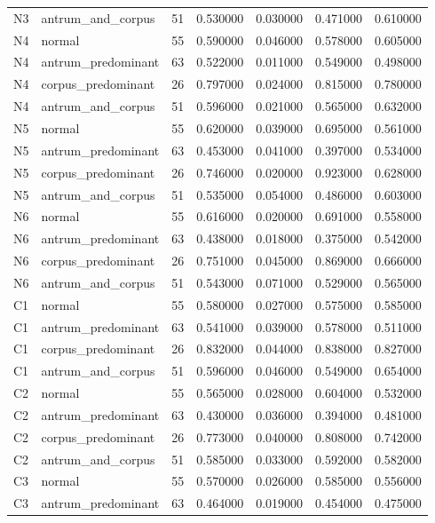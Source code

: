 \begin{table}
\begin{tabular}{llrrrrr}
N3 & antrum\_and\_corpus & 51 & 0.530000 & 0.030000 & 0.471000 & 0.610000 \\
N4 & normal & 55 & 0.590000 & 0.046000 & 0.578000 & 0.605000 \\
N4 & antrum\_predominant & 63 & 0.522000 & 0.011000 & 0.549000 & 0.498000 \\
N4 & corpus\_predominant & 26 & 0.797000 & 0.024000 & 0.815000 & 0.780000 \\
N4 & antrum\_and\_corpus & 51 & 0.596000 & 0.021000 & 0.565000 & 0.632000 \\
N5 & normal & 55 & 0.620000 & 0.039000 & 0.695000 & 0.561000 \\
N5 & antrum\_predominant & 63 & 0.453000 & 0.041000 & 0.397000 & 0.534000 \\
N5 & corpus\_predominant & 26 & 0.746000 & 0.020000 & 0.923000 & 0.628000 \\
N5 & antrum\_and\_corpus & 51 & 0.535000 & 0.054000 & 0.486000 & 0.603000 \\
N6 & normal & 55 & 0.616000 & 0.020000 & 0.691000 & 0.558000 \\
N6 & antrum\_predominant & 63 & 0.438000 & 0.018000 & 0.375000 & 0.542000 \\
N6 & corpus\_predominant & 26 & 0.751000 & 0.045000 & 0.869000 & 0.666000 \\
N6 & antrum\_and\_corpus & 51 & 0.543000 & 0.071000 & 0.529000 & 0.565000 \\
C1 & normal & 55 & 0.580000 & 0.027000 & 0.575000 & 0.585000 \\
C1 & antrum\_predominant & 63 & 0.541000 & 0.039000 & 0.578000 & 0.511000 \\
C1 & corpus\_predominant & 26 & 0.832000 & 0.044000 & 0.838000 & 0.827000 \\
C1 & antrum\_and\_corpus & 51 & 0.596000 & 0.046000 & 0.549000 & 0.654000 \\
C2 & normal & 55 & 0.565000 & 0.028000 & 0.604000 & 0.532000 \\
C2 & antrum\_predominant & 63 & 0.430000 & 0.036000 & 0.394000 & 0.481000 \\
C2 & corpus\_predominant & 26 & 0.773000 & 0.040000 & 0.808000 & 0.742000 \\
C2 & antrum\_and\_corpus & 51 & 0.585000 & 0.033000 & 0.592000 & 0.582000 \\
C3 & normal & 55 & 0.570000 & 0.026000 & 0.585000 & 0.556000 \\
C3 & antrum\_predominant & 63 & 0.464000 & 0.019000 & 0.454000 & 0.475000 \\

\end{tabular}
\end{table}
